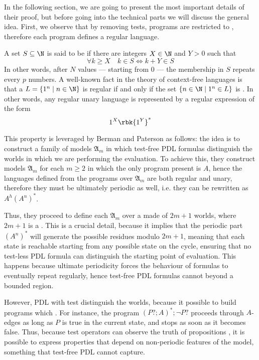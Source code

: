 \documentclass[a4paper, 12pt]{report}
\begin{document}
    In the following section, we are going to present the most important details of their proof, but before going into the technical parts we will discuss the general idea. First, we observe that by removing tests, programs are restricted to , therefore each program defines a regular language.

    A set $S \subseteq \N$ is said to be  if there are integers $X \in \N$ and $Y > 0$ such that $$\forall k \ge X \quad k \in S \iff k + Y \in S$$ In other words, after $N$ values --- starting from 0 --- the membership in $S$ repeats every $p$ numbers. A well-known fact in the theory of context-free languages is that a  $L = \{1^n \mid n \in \N\}$ is regular if and only if the set $\{n \in \N \mid 1^n \in L\}$ is . In other words, any regular unary language is represented by a regular expression of the form $$1^X \rbk{1^Y}^*$$

    This property is leveraged by Berman and Paterson as follows: the idea is to construct a family of models $\mathfrak A_m$ in which test-free PDL formulas  distinguish the worlds in which we are performing the evaluation. To achieve this, they construct models $\mathfrak A_m$ for each $m \ge 2$ in which the only program present is $A$, hence the languages defined from the programs over $\mathfrak A_m$ are both regular and unary, therefore they must be ultimately periodic as well, i.e. they can be rewritten as $A^h(A^n)^*$.

    Thus, they proceed to define each $\mathfrak A_m$ over a  made of $2m + 1$ worlds, where $2m + 1$ is a . This is a crucial detail, because it implies that the periodic part $(A^n)^*$ will generate  the possible residues modulo $2m + 1$, meaning that each state is reachable starting from any possible state on the cycle, ensuring that no test-less PDL formula can distinguish the starting point of evaluation. This happens because ultimate periodicity forces the behaviour of formulas to eventually repeat regularly, hence test-free PDL formulas cannot  beyond a bounded region.

    However, PDL with test  distinguish the worlds, because it possible to build programs which . For instance, the program $(P?; A)^*; \lnot P?$ proceeds through $A$-edges as long as $P$ is true in the current state, and stops as soon as it becomes false. Thus, because test operators can observe the truth of propositions , it is possible to express properties that depend on non-periodic features of the model, something that test-free PDL cannot capture.
\end{document}

